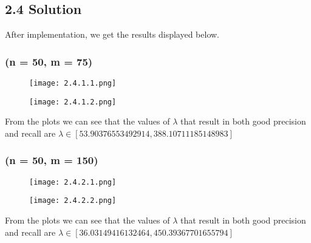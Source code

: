\documentclass{article}
\begin{document}
\newpage
\subsection*{2.4 Solution}
After implementation, we get the results displayed below.
\subsubsection*{(n = 50, m = 75)}
\begin{figure}[h]
    \centering
    \begin{minipage}{0.45\linewidth}
        \centering
        \texttt{[image: 2.4.1.1.png]}
    \end{minipage}%
    \hspace{0.05\linewidth} %
    \begin{minipage}{0.45\linewidth}
        \centering
        \texttt{[image: 2.4.1.2.png]}
    \end{minipage}
\end{figure}
From the plots we can see that the values of $\lambda$ that result in both good precision and recall are $\lambda \in [53.90376553492914, 388.10711185148983]$

\subsubsection*{(n = 50, m = 150)}
\begin{figure}[h]
    \centering
    \begin{minipage}{0.45\linewidth}
        \centering
        \texttt{[image: 2.4.2.1.png]}
    \end{minipage}%
    \hspace{0.05\linewidth} %
    \begin{minipage}{0.45\linewidth}
        \centering
        \texttt{[image: 2.4.2.2.png]}
    \end{minipage}
\end{figure}
From the plots we can see that the values of $\lambda$ that result in both good precision and recall are $\lambda \in [36.03149416132464, 450.39367701655794]$

\newpage
\end{document}
